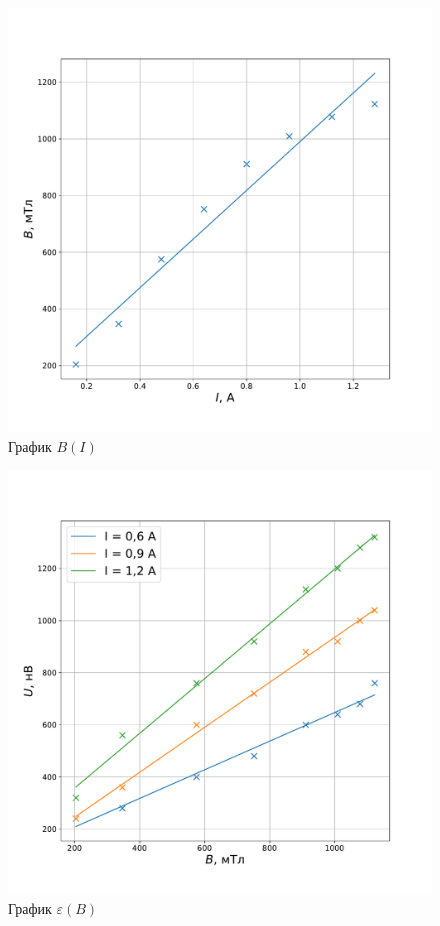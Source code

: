 \documentclass[a4paper, 12pt]{article}
\newcommand{\eps}{\varepsilon}
\begin{document}
\begin{figure}[!h]
    \includegraphics[scale = 0.35]{B_I}
    \centering
    \caption{График $B (I)$}
\end{figure}

\begin{figure}[!h]
    \includegraphics[scale = 0.35]{Silver}
    \centering
    \caption{График $\eps (B)$}
\end{figure}
\end{document}

